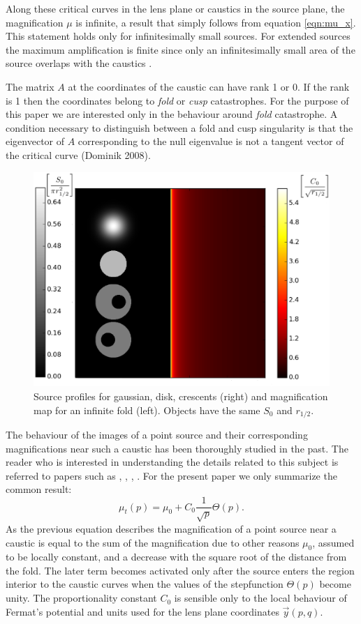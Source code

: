 Along these critical curves in the lens plane or caustics in the source plane,  the magnification $\mu$ is infinite, a result that simply follows from equation \ref{eqn:mu_x}. This statement holds only for infinitesimally small sources. For extended sources the maximum amplification is finite since only an infinitesimally small area of the source
overlaps with the caustics \citep{1986BAAS...18T.907S}. 

The matrix $A$ at the coordinates of the caustic can have rank 1 or 0. If the rank is 1 then the coordinates belong to {\em fold\/} or {\em cusp\/} catastrophes. For the purpose 
of this paper we are interested only in the behaviour around {\em fold\/} catastrophe. A condition necessary to distinguish between a fold and cusp singularity is that the
eigenvector of $A$ corresponding to the null eigenvalue is not a tangent vector of the critical curve \citep{1992A&A...260....1S}(Dominik 2008).


\begin{figure}
\includegraphics[width = .49\textwidth]{plots/infinite_fold.eps}
\caption{\label{fig:infinite_fold}  Source profiles for gaussian, disk, crescents (right) and magnification map for an infinite fold (left). Objects have the same $S_{0}$ and $r_{1/2}$. }
\end{figure}




The behaviour of the images of a point source and their corresponding magnifications near such a caustic has been thoroughly studied in the past. The reader who is interested in 
understanding the details related to this subject is referred to papers such as \cite{1986ApJ...310..568B}, \cite{1992A&A...260....1S}, \cite{2002ApJ...574..970G}, \cite{2002ApJ...580..468G}. For the present paper we only 
summarize the common result:
\begin {equation}
 \mu_{t}(p) = \mu_0 + C_0 \frac{1}{\sqrt{p}} \Theta(p).
\end {equation}
As the previous equation describes the magnification of a point source near a caustic is equal to the sum of the magnification due to other reasons $\mu_0$, assumed to be locally constant,  and a decrease with
the square root of the distance from the fold. The later term becomes activated only after the source enters the region interior to the caustic curves when the values of the stepfunction $\Theta(p)$ become unity. The proportionality
constant $C_0$  is sensible only to the local behaviour of Fermat's potential and units used for the lens plane coordinates $\vec{y}(p,q)$. 

